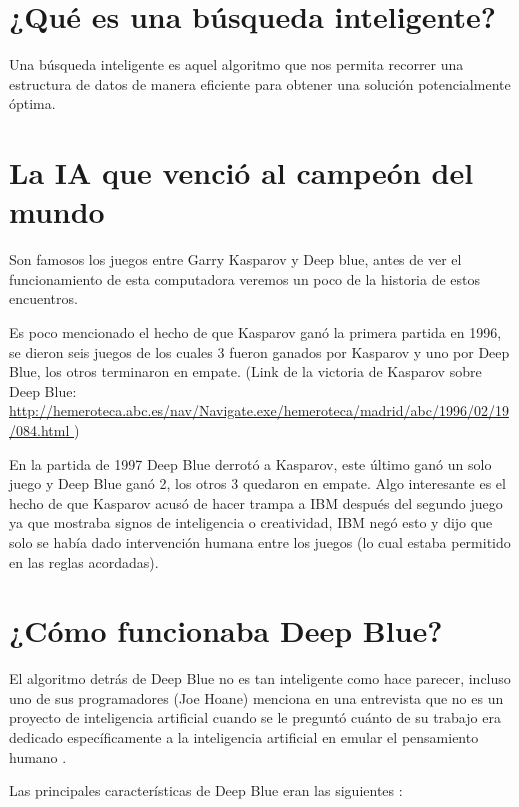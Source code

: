 \documentclass[11pt,fleqn]{book} %
\begin{document}
\section{¿Qué es una búsqueda inteligente?} 

Una búsqueda inteligente es aquel algoritmo que nos permita recorrer una estructura de datos de manera eficiente para obtener una solución potencialmente óptima. 

\section{La IA que venció al campeón del mundo} 

Son famosos los juegos entre Garry Kasparov y Deep blue, antes de ver el funcionamiento de esta computadora veremos un poco de la historia de estos encuentros.

Es poco mencionado el hecho de que Kasparov ganó la primera partida en 1996, se dieron seis juegos de los cuales 3 fueron ganados por Kasparov y uno por Deep Blue, los otros terminaron en empate. (Link de la victoria de Kasparov sobre Deep Blue: \url{http://hemeroteca.abc.es/nav/Navigate.exe/hemeroteca/madrid/abc/1996/02/19/084.html })

En la partida de 1997 Deep Blue derrotó a Kasparov, este último ganó un solo juego y Deep Blue ganó 2, los otros 3 quedaron en empate. Algo interesante es el hecho de que Kasparov acusó de hacer trampa a IBM \cite{hsu2004behind} después del segundo juego ya que mostraba signos de inteligencia o creatividad, IBM negó esto y dijo que solo se había dado intervención humana entre los juegos (lo cual estaba permitido en las reglas acordadas).

\section{¿Cómo funcionaba Deep Blue?} 

El algoritmo detrás de Deep Blue no es tan inteligente como hace parecer, incluso uno de sus programadores (Joe Hoane) menciona en una entrevista que no es un proyecto de inteligencia artificial cuando se le preguntó cuánto de su trabajo era dedicado específicamente a la inteligencia artificial en emular el pensamiento humano \cite{DBFORBES}.

Las principales características de Deep Blue eran las siguientes 
\cite{CAMPBELL200257}:
\end{document}
